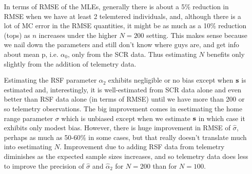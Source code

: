In terms of RMSE of the MLEs, generally there is about a 5\% reduction
in RMSE when we have at least 2 telemtered individuals,
and, although
there is a lot of MC error in the RMSE quantities, it might be as much
as a 10\% reduction (tops) as $n$ increases under the higher $N=200$ setting. This makes sense because
we nail down the parameters and still don't know where guys are, and
get info about mean p, i.e. $\alpha_{0}$, only from the SCR data. Thus
estimating $N$  benefits only slightly from the addition of telemetry
data.

Estimating the RSF parameter $\alpha_{2}$ exhibits negligible or no
bias except when ${\bf s}$ is estimated and, interestingly, it is
well-estimated from SCR data alone and even better than RSF data alone
(in terms of RMSE) until we have more than 200 or so telemetry
observations.  The big improvement comes in esetimating the home range
parameter $\sigma$ which is unbiased except when we estimate ${\bf s}$
in which case it exhibits only modest bias.  However, there is huge
improvement in RMSE of $\hat{\sigma}$, perhaps as much as 50-60\% in
some cases, but that really doesn't translate much into esetimating
$N$.  Improvement due to adding RSF data from telemetry diminishes as
the expected sample sizes increases, and so telemetry data does less
to improve the precision of
$\hat{\sigma}$ and $\hat{\alpha}_{2}$
for $N=200$ than for $N=100$.

